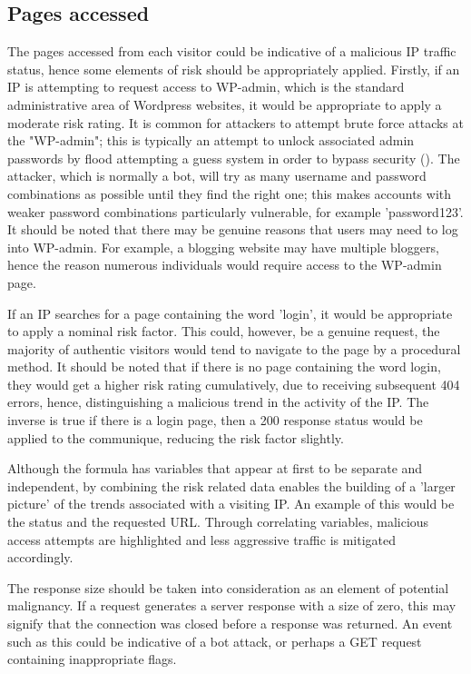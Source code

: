 \subsection{Pages accessed}

The pages accessed from each visitor could be indicative of a malicious IP traffic status, hence some elements of risk should be appropriately applied. Firstly, if an IP is attempting to request access to WP-admin, which is the standard administrative area of Wordpress websites, it would be appropriate to apply a moderate risk rating. It is common for attackers to attempt brute force attacks at the "WP-admin"; this is typically an attempt to unlock associated admin passwords by flood attempting a guess system in order to bypass security (\cite{Brute}). The attacker, which is normally a bot, will try as many username and password combinations as possible until they find the right one; this makes accounts with weaker password combinations particularly vulnerable, for example 'password123'. It should be noted that there may be genuine reasons that users may need to log into WP-admin. For example, a blogging website may have multiple bloggers, hence the reason numerous individuals would require access to the WP-admin page.

If an IP searches for a page containing the word 'login', it would be appropriate to apply a nominal risk factor. This could, however, be a genuine request, the majority of authentic visitors would tend to navigate to the page by a procedural method. It should be noted that if there is no page containing the word login, they would get a higher risk rating cumulatively, due to receiving subsequent 404 errors, hence, distinguishing a malicious trend in the activity of the IP. The inverse is true if there is a login page, then a 200 response status would be applied to the communique, reducing the risk factor slightly.

Although the formula has variables that appear at first to be separate and independent, by combining the risk related data enables the building of a 'larger picture' of the trends associated with a visiting IP.  An example of this would be the status and the requested URL. Through correlating variables, malicious access attempts are highlighted and less aggressive traffic is mitigated accordingly.

The response size should be taken into consideration as an element of potential malignancy. If a request generates a server response with a size of zero, this may signify that the connection was closed before a response was returned. An event such as this could be indicative of a bot attack, or perhaps a GET request containing inappropriate flags.

